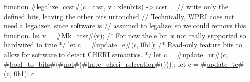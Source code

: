 function #\hyperref[sailRISCVzlegalizzezyccsr]{legalize\_ccsr}#(c : ccsr, v : xlenbits) -> ccsr = {
  // write only the defined bits, leaving the other bits untouched
  // Technically, WPRI does not need a legalizer, since software is
  // assumed to legalize; so we could remove this function.
  let v = #\hyperref[sailRISCVzMkzyccsr]{Mk\_ccsr}#(v);
  /* For now the e bit is not really supported so hardwired to true */
  let c = #\hyperref[sailRISCVzupdatezye]{update\_e}#(c, 0b1);
  /* Read-only feature bits to allow for software to detect CHERI semantics. */
  let c = #\hyperref[sailRISCVzupdatezynr]{update\_nr}#(c, #\hyperref[sailRISCVzboolzytozybits]{bool\_to\_bits}#(#\hyperref[sailRISCVznot]{not}#(#\hyperref[sailRISCVzhavezycherizyrelocation]{have\_cheri\_relocation}#())));
  let c = #\hyperref[sailRISCVzupdatezytc]{update\_tc}#(c, 0b1);
  c
}
